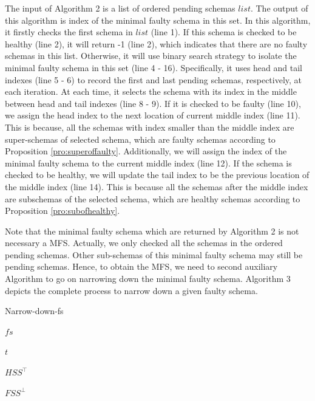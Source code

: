 \documentclass{sig-alternate-05-2015}
\begin{document}
{The input of Algorithm 2 is a list of ordered pending schemas $list$. The output of this algorithm is index of the minimal faulty schema in this set. In this algorithm, it firstly checks the first schema in $list$ (line 1). If this schema is checked to be healthy (line 2), it will return -1 (line 2), which indicates that there are no faulty schemas in this list. Otherwise, it will use binary search strategy to isolate the minimal faulty schema in this set (line 4 - 16). Specifically, it uses head and tail indexes (line 5 - 6) to record the first and last pending schemas, respectively, at each iteration. At each time, it selects the schema with its index in the middle between head and tail indexes (line 8 - 9). If it is checked to be faulty (line 10), we assign the head index to the next location of current middle index (line 11). This is because, all the schemas with index smaller than the middle index are super-schemas of selected schema, which are faulty schemas according to Proposition \ref{pro:superoffaulty}. Additionally, we will assign the index of the minimal faulty schema to the current middle index (line 12). If the schema is checked to be healthy, we will update the tail index to be the previous location of the middle index (line 14). This is because all the schemas after the middle index are subschemas of the selected schema, which are healthy schemas according to Proposition \ref{pro:subofhealthy}.

Note that the minimal faulty schema which are returned by Algorithm 2 is not necessary a MFS. Actually, we only checked all the schemas in the ordered pending schemas. Other sub-schemas of this minimal faulty schema may still be pending schemas. Hence, to obtain the MFS, we need to second auxiliary Algorithm to go on narrowing down the minimal faulty schema. Algorithm 3 depicts the complete process to narrow down a given faulty schema.



\begin{algorithm}[!htb]
  \caption{Narrow-down-fs}
  \begin{algorithmic}[1]

    \Require  $fs$ 

      $t$ 

     $HSS^{\top}$ 

     $FSS^{\bot}$ 


\end{algorithmic}
\end{algorithm}}
\end{document}
